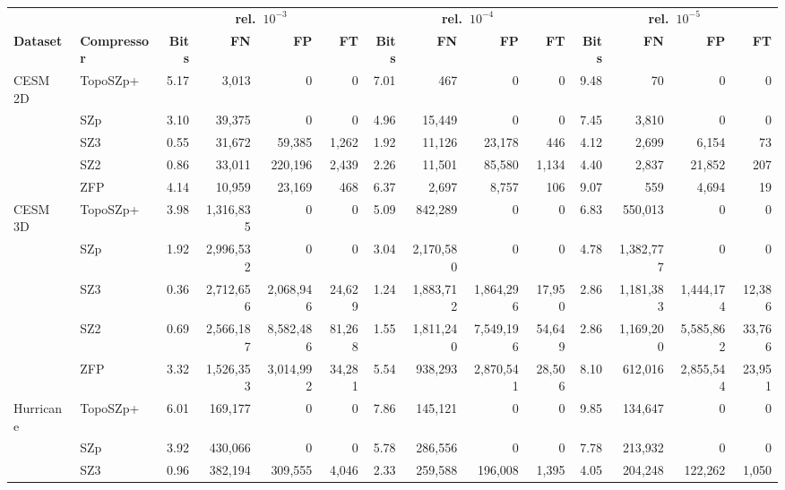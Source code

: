 \begin{tabular}{@{}llrrrrrrrrrrrr@{}}
\toprule
 &  & \multicolumn{4}{c}{\textbf{rel.\ $10^{-3}$}} & \multicolumn{4}{c}{\textbf{rel.\ $10^{-4}$}} & \multicolumn{4}{c}{\textbf{rel.\ $10^{-5}$}} \\
\cmidrule(lr){3-6}\cmidrule(lr){7-10}\cmidrule(lr){11-14}
\textbf{Dataset} & \textbf{Compressor} & \textbf{Bits} & \textbf{FN} & \textbf{FP} & \textbf{FT} & \textbf{Bits} & \textbf{FN} & \textbf{FP} & \textbf{FT} & \textbf{Bits} & \textbf{FN} & \textbf{FP} & \textbf{FT} \\
\midrule
CESM 2D & TopoSZp+ & 5.17 & 3{,}013 & 0 & 0 & 7.01 & 467 & 0 & 0 & 9.48 & 70 & 0 & 0 \\
 & SZp & 3.10 & 39{,}375 & 0 & 0 & 4.96 & 15{,}449 & 0 & 0 & 7.45 & 3{,}810 & 0 & 0 \\
 & SZ3 & 0.55 & 31{,}672 & 59{,}385 & 1{,}262 & 1.92 & 11{,}126 & 23{,}178 & 446 & 4.12 & 2{,}699 & 6{,}154 & 73 \\
 & SZ2 & 0.86 & 33{,}011 & 220{,}196 & 2{,}439 & 2.26 & 11{,}501 & 85{,}580 & 1{,}134 & 4.40 & 2{,}837 & 21{,}852 & 207 \\
 & ZFP & 4.14 & 10{,}959 & 23{,}169 & 468 & 6.37 & 2{,}697 & 8{,}757 & 106 & 9.07 & 559 & 4{,}694 & 19 \\
\midrule
CESM 3D & TopoSZp+ & 3.98 & 1{,}316{,}835 & 0 & 0 & 5.09 & 842{,}289 & 0 & 0 & 6.83 & 550{,}013 & 0 & 0 \\
 & SZp & 1.92 & 2{,}996{,}532 & 0 & 0 & 3.04 & 2{,}170{,}580 & 0 & 0 & 4.78 & 1{,}382{,}777 & 0 & 0 \\
 & SZ3 & 0.36 & 2{,}712{,}656 & 2{,}068{,}946 & 24{,}629 & 1.24 & 1{,}883{,}712 & 1{,}864{,}296 & 17{,}950 & 2.86 & 1{,}181{,}383 & 1{,}444{,}174 & 12{,}386 \\
 & SZ2 & 0.69 & 2{,}566{,}187 & 8{,}582{,}486 & 81{,}268 & 1.55 & 1{,}811{,}240 & 7{,}549{,}196 & 54{,}649 & 2.86 & 1{,}169{,}200 & 5{,}585{,}862 & 33{,}766 \\
 & ZFP & 3.32 & 1{,}526{,}353 & 3{,}014{,}992 & 34{,}281 & 5.54 & 938{,}293 & 2{,}870{,}541 & 28{,}506 & 8.10 & 612{,}016 & 2{,}855{,}544 & 23{,}951 \\
\midrule
Hurricane & TopoSZp+ & 6.01 & 169{,}177 & 0 & 0 & 7.86 & 145{,}121 & 0 & 0 & 9.85 & 134{,}647 & 0 & 0 \\
 & SZp & 3.92 & 430{,}066 & 0 & 0 & 5.78 & 286{,}556 & 0 & 0 & 7.78 & 213{,}932 & 0 & 0 \\
 & SZ3 & 0.96 & 382{,}194 & 309{,}555 & 4{,}046 & 2.33 & 259{,}588 & 196{,}008 & 1{,}395 & 4.05 & 204{,}248 & 122{,}262 & 1{,}050 \\

\end{tabular}
